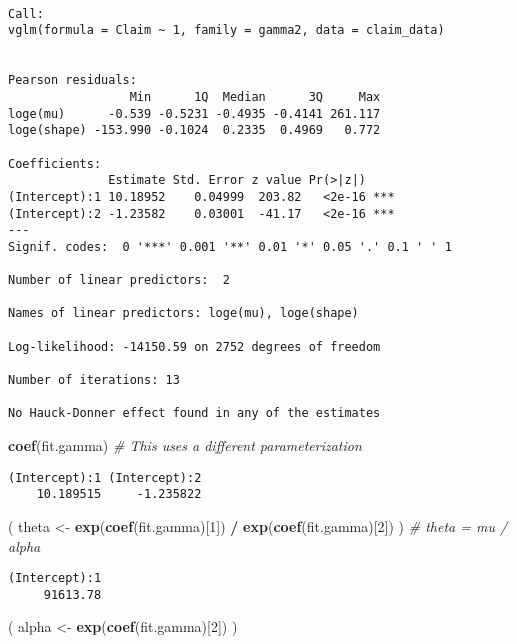 \documentclass[]{book}
\newenvironment{Shaded}{\begin{snugshade}}{\end{snugshade}}
\newcommand{\KeywordTok}[1]{\textcolor[rgb]{0.13,0.29,0.53}{\textbf{#1}}}
\newcommand{\DecValTok}[1]{\textcolor[rgb]{0.00,0.00,0.81}{#1}}
\newcommand{\StringTok}[1]{\textcolor[rgb]{0.31,0.60,0.02}{#1}}
\newcommand{\CommentTok}[1]{\textcolor[rgb]{0.56,0.35,0.01}{\textit{#1}}}
\newcommand{\OperatorTok}[1]{\textcolor[rgb]{0.81,0.36,0.00}{\textbf{#1}}}
\newcommand{\NormalTok}[1]{#1}
\theoremstyle{definition}
\theoremstyle{definition}
\theoremstyle{definition}
\theoremstyle{remark}
\begin{document}
\begin{verbatim}

Call:
vglm(formula = Claim ~ 1, family = gamma2, data = claim_data)


Pearson residuals:
                 Min      1Q  Median      3Q     Max
loge(mu)      -0.539 -0.5231 -0.4935 -0.4141 261.117
loge(shape) -153.990 -0.1024  0.2335  0.4969   0.772

Coefficients: 
              Estimate Std. Error z value Pr(>|z|)    
(Intercept):1 10.18952    0.04999  203.82   <2e-16 ***
(Intercept):2 -1.23582    0.03001  -41.17   <2e-16 ***
---
Signif. codes:  0 '***' 0.001 '**' 0.01 '*' 0.05 '.' 0.1 ' ' 1

Number of linear predictors:  2 

Names of linear predictors: loge(mu), loge(shape)

Log-likelihood: -14150.59 on 2752 degrees of freedom

Number of iterations: 13 

No Hauck-Donner effect found in any of the estimates
\end{verbatim}

\begin{Shaded}
\begin{Highlighting}[]
\KeywordTok{coef}\NormalTok{(fit.gamma)                 }\CommentTok{# This uses a different parameterization }
\end{Highlighting}
\end{Shaded}

\begin{verbatim}
(Intercept):1 (Intercept):2 
    10.189515     -1.235822 
\end{verbatim}

\begin{Shaded}
\begin{Highlighting}[]
\NormalTok{( theta <-}\StringTok{ }\KeywordTok{exp}\NormalTok{(}\KeywordTok{coef}\NormalTok{(fit.gamma)[}\DecValTok{1}\NormalTok{]) }\OperatorTok{/}\StringTok{ }\KeywordTok{exp}\NormalTok{(}\KeywordTok{coef}\NormalTok{(fit.gamma)[}\DecValTok{2}\NormalTok{]) )  }\CommentTok{# theta = mu / alpha}
\end{Highlighting}
\end{Shaded}

\begin{verbatim}
(Intercept):1 
     91613.78 
\end{verbatim}

\begin{Shaded}
\begin{Highlighting}[]
\NormalTok{( alpha <-}\StringTok{ }\KeywordTok{exp}\NormalTok{(}\KeywordTok{coef}\NormalTok{(fit.gamma)[}\DecValTok{2}\NormalTok{]) )}
\end{Highlighting}
\end{Shaded}
\end{document}
